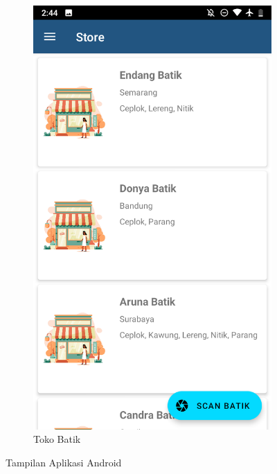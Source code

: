 \begin{figure}[hpt!]
\begin{subfigure}[b]{0.3\textwidth}
      \includegraphics[width=\textwidth]{gambar/lima.png}
      
      \caption{Toko Batik}
      
      \label{fig:lima}
    \end{subfigure}
      
    \caption{Tampilan Aplikasi Android}
    \label{fig:android}
  
  \end{figure}

